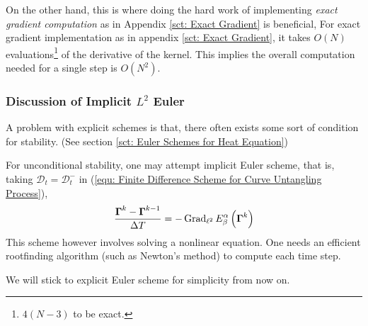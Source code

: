\documentclass[../dissertation.tex]{subfiles}
\begin{document}
On the other hand, this is where doing the hard work of implementing \textit{exact gradient computation} as in Appendix \ref{sct: Exact Gradient} is beneficial,
For exact gradient implementation as in appendix \ref{sct: Exact Gradient},
it takes $O \left( N \right)$ evaluations\footnote{$4 \left( N-3 \right)$ to be exact.} of the derivative of the kernel.
This implies the overall computation needed for a single step is $O \left( N^2 \right)$.

\subsubsection{Discussion of Implicit $L^2$ Euler}
A problem with explicit schemes is that, there often exists some sort of condition for stability. (See section \ref{sct: Euler Schemes for Heat Equation})

For unconditional stability, one may attempt implicit Euler scheme, that is,
taking $\mathcal{D}_t = \mathcal{D}_t^-$ in (\ref{equ: Finite Difference Scheme for Curve Untangling Process}),
\begin{equation}
    \frac{\boldsymbol{\Gamma}^{k} - \boldsymbol{\Gamma}^{k-1}}{\Delta T} = -\operatorname{Grad}_{\ell^2} E_{\beta}^{\alpha} \left( \boldsymbol{\Gamma}^k \right)
\end{equation}
This scheme however involves solving a nonlinear equation.
One needs an efficient rootfinding algorithm (such as Newton's method) to compute each time step.

We will stick to explicit Euler scheme for simplicity from now on.

\end{document}
